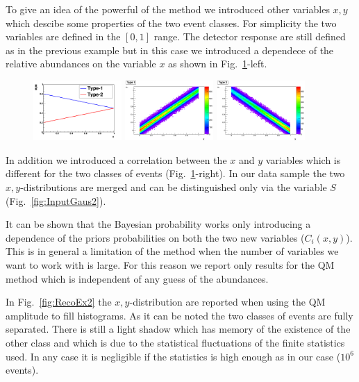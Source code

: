 To give an idea of the powerful of the method we introduced other variables
$x,y$ which descibe some properties of the two event classes.
For simplicity the two variables are defined in the $[0,1]$ range.
The detector response are still defined as in the previous example but in this
case we introduced a dependece of the relative abundances on the variable $x$
as shown in Fig.~\ref{fig:SimEx2}-left.

\begin{figure}[!htb]
\centering
\includegraphics[width=0.3\textwidth]{../png/figAbundances.png}
\includegraphics[width=0.3\textwidth]{../png/figType1.png}
\includegraphics[width=0.3\textwidth]{../png/figType2.png}
\caption{}
\label{fig:SimEx2}
\end{figure}

In addition we introduced a correlation between the $x$ and $y$ variables
which is different for the two classes of events (Fig.~\ref{fig:SimEx2}-right). 
In our data sample the two $x,y$-distributions are merged and can be
distinguished only via the variable $S$ (Fig.~\ref{fig:InputGaus2}).

It can be shown that the Bayesian probability works only introducing a
dependence of the priors probabilities on both the two new variables
($C_{i}(x,y)$). This is in general a limitation of the method when the
  number of variables we want to work with is large.
For this reason we report only results for the QM method which is independent
of any guess of the abundances.

In Fig.~\ref{fig:RecoEx2} the $x,y$-distribution are reported when using the QM amplitude
to fill histograms.
As it can be noted the two classes of events are fully separated.
There is still a light shadow which has memory of the existence of the other
class and which is due to the statistical fluctuations of the finite
statistics used. In any case it is negligible if the statistics is high enough
as in our case ($10^{6}$ events).

